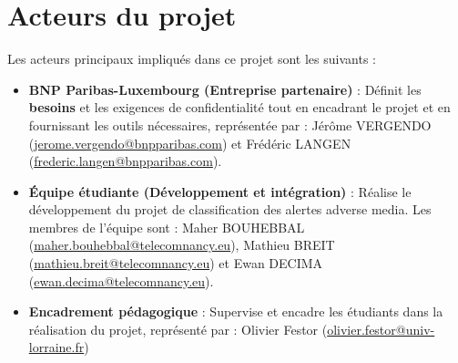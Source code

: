 \section{Acteurs du projet}

Les acteurs principaux impliqués dans ce projet sont les suivants :

\begin{itemize}
    \item \textbf{BNP Paribas-Luxembourg (Entreprise partenaire)} : Définit les \textbf{besoins} et les exigences de confidentialité tout en encadrant le projet et en fournissant les outils nécessaires, représentée par : Jérôme VERGENDO (\href{mailto:jerome.vergendo@bnpparibas.com}{jerome.vergendo@bnpparibas.com}) et Frédéric LANGEN (\href{mailto:frederic.langen@bnpparibas.com}{frederic.langen@bnpparibas.com}).
    \item \textbf{Équipe étudiante (Développement et intégration)} : Réalise le développement du projet de classification des alertes adverse media.
    Les membres de l'équipe sont : Maher BOUHEBBAL (\href{mailto:maher.bouhebbal@telecomnancy.eu}{maher.bouhebbal@telecomnancy.eu}), Mathieu BREIT (\href{mailto:mathieu.breit@telecomnancy.eu}{mathieu.breit@telecomnancy.eu}) et Ewan DECIMA (\href{mailto:ewan.decima@telecomnancy.eu}{ewan.decima@telecomnancy.eu}).
    \item \textbf{Encadrement pédagogique} : Supervise et encadre les étudiants dans la réalisation du projet, représenté par : Olivier Festor (\href{mailto:olivier.festor@univ-lorraine.fr}{olivier.festor@univ-lorraine.fr})
\end{itemize}






